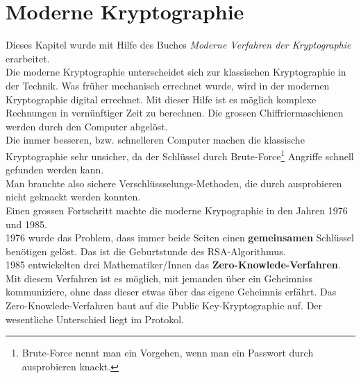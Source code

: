 \newpage
\section{Moderne Kryptographie}
Dieses Kapitel wurde mit Hilfe des Buches \textit{Moderne Verfahren der Kryptographie} erarbeitet.\\[2ex]
Die moderne Kryptographie unterscheidet sich zur klassischen Kryptographie in der Technik. Was früher mechanisch errechnet wurde, wird in der modernen Kryptographie digital errechnet. Mit dieser Hilfe ist es möglich komplexe Rechnungen in vernünftiger Zeit zu berechnen. Die grossen Chiffriermaschienen werden durch den Computer abgelöst.\\
Die immer besseren, bzw. schnelleren Computer machen die klassische Kryptographie sehr unsicher, da der Schlüssel durch Brute-Force\footnote{Brute-Force nennt man ein Vorgehen, wenn man ein Passwort durch ausprobieren knackt.} Angriffe schnell gefunden werden kann.\\
Man brauchte also sichere Verschlüssselungs-Methoden, die durch ausprobieren nicht geknackt werden konnten.\\
Einen grossen Fortschritt machte die moderne Krypographie in den Jahren 1976 und 1985.\\
1976 wurde das Problem, dass immer beide Seiten einen \textbf{gemeinsamen} Schlüssel benötigen gelöst. Das ist die Geburtstunde des RSA-Algorithmus.\\
1985 entwickelten drei Mathematiker/Innen das \textbf{Zero-Knowlede-Verfahren}. Mit diesem Verfahren ist es möglich, mit jemanden über ein Geheimniss kommuniziere, ohne dass dieser etwas über das eigene Geheimnis erfährt. Das Zero-Knowlede-Verfahren baut auf die Public Key-Kryptographie auf. Der wesentliche Unterschied liegt im Protokol.
%
